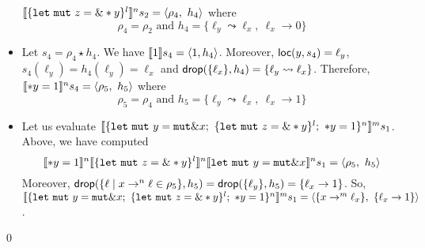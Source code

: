 \begin{example}
\begin{itemize}
    $\denl[\{\mathtt{let\ mut}\ z = \borrow*y\}^l]{n}{s_2}=\langle \rho_4,\ h_4\rangle$
    where
    \[\rho_4 = \rho_2 \text{ and } h_4 = \{\ell_y\leadsto \ell_x,\ \ell_x\to 0\}\]
    \item Let $s_4 = \rho_4 \star h_4$.
    We have $\den[1]{s_4} = \langle 1,h_4\rangle$. Moreover,
    $\loc(y,s_4) = \ell_y$, $s_4(\ell_y) = h_4(\ell_y) = \ell_x$ and
    $\drop(\{\ell_x\}, h_4) = \{\ell_y\leadsto \ell_x\}$. Therefore,
    $\denl[*y = 1]{n}{s_4}=\langle \rho_5,\ h_5\rangle$ where
    \[\rho_5 = \rho_4 \text{ and } h_5 = \{\ell_y\leadsto \ell_x,\ \ell_x\to 1\}\]
    \item Let us evaluate $\denl[\{\mathtt{let\ mut}\ y = \mathtt{mut}\borrow x;\
    \{ \mathtt{let\ mut}\ z = \borrow*y \}^l;\ *y = 1 \}^n]{m}{s_1}$.
    Above, we have computed
    \[\denl[*y = 1]{n}{
      \denl[\{\mathtt{let\ mut}\ z = \borrow*y\}^l]{n}{
        \denl[\mathtt{let\ mut}\ y = \mathtt{mut}\borrow x]{n}{s_1}
      } = \langle \rho_5,\ h_5\rangle
    }\]
    Moreover, $\drop(\{\ell\mid x\to^n\ell\in\rho_5\},h_5) =
    \drop(\{\ell_y\},h_5) = \{\ell_x\to 1\}$. So,
    $\denl[\{\mathtt{let\ mut}\ y = \mathtt{mut}\borrow x;\
    \{ \mathtt{let\ mut}\ z = \borrow*y \}^l;\ *y = 1 \}^n]{m}{s_1} =
    \langle \{x\to^m\ell_x\},\ \{\ell_x\to 1\}\rangle$.
  \end{itemize}
  \qed
\end{example}

